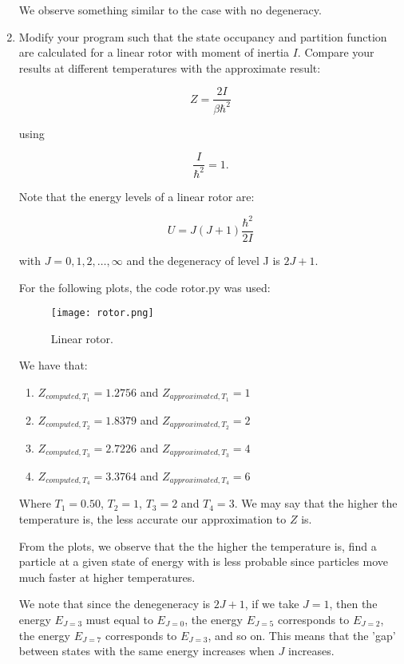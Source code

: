 \documentclass[12pt,letterpaper]{report}
\begin{document}
\begin{enumerate}
		We observe something similar to the case with no degeneracy.
		
		\item
		Modify your program such that the state occupancy and partition	function are calculated for a linear rotor with moment of inertia 	$I$. Compare your results at different temperatures with the approximate result:
		
		$$
		Z = \frac{2I}{\beta\hbar^2}
		$$
		
		using
		
		$$
		\frac{I}{\hbar^2} = 1.
		$$
		
		Note that the energy levels of a linear rotor are:
		
		$$
		U = J(J+1)\frac{\hbar^2}{2I}
		$$
		
		with $J= 0, 1, 2, \dots, \infty$ and the degeneracy of level J is
		$2J +1$.		

		For the following plots, the code rotor.py was used: 
		
		\begin{figure}[H]
			\centering
			\texttt{[image: rotor.png]}		
			\caption{Linear rotor.}
			\label{fig::rotor}
		\end{figure}  
		
		We have that: 
		\begin{enumerate}
			\item 
			$Z_{computed,T_{1}} = 1.2756$ and $Z_{approximated,T_{1}} = 1$
			\item
			$Z_{computed,T_{2}} = 1.8379$ and $Z_{approximated,T_{2}} = 2$
			\item
			$Z_{computed,T_{3}} = 2.7226$ and $Z_{approximated,T_{3}} = 4$
			\item
			$Z_{computed,T_{4}} = 3.3764$ and $Z_{approximated,T_{4}} = 6$
		\end{enumerate}		
		
		Where $T_{1} =0.50$, $T_{2} =1$, $T_{3} =2$ and $T_{4} =3$.	We may say that the higher the temperature is, the less accurate our approximation to $Z$ is. 
		
		From the plots, we observe that the the higher the temperature is, find a particle at a given state of energy with is less probable since particles move much faster at higher temperatures.
		
		We note that since the denegeneracy is $2J+1$, if we take $J=1$, then the energy $E_{J=3}$ must equal to $E_{J=0}$, the energy $E_{J=5}$ corresponds to $E_{J=2}$, the energy $E_{J=7}$ corresponds to $E_{J=3}$, and so on. This means that the 'gap' between states with the same energy increases when $J$ increases.
		
	\end{enumerate}		
	
\end{document}
